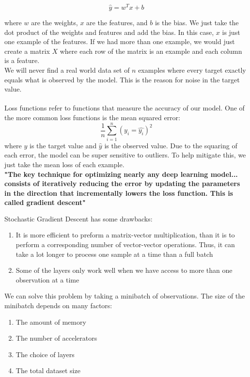 \documentclass{report}
\begin{document}
$$\hat{y} = w^Tx + b$$

where $w$ are the weights, $x$ are the features, and $b$ is the bias. We just take the dot product of the weights and features and add the bias. In this case, $x$ is just one example of the features. If we had more than one example, we would just create a matrix $X$ where each row of the matrix is an example and each column is a feature. 
\\

We will never find a real world data set of $n$ examples where every target exactly equals what is observed by the model. This is the reason for noise in the target value. 
\\

\\

Loss functions refer to functions that measure the accuracy of our model. One of the more common loss functions is the mean squared error: 
$$\frac{1}{n}\sum_{i=1}^n\left(y_i = \hat{y_i}\right)^2$$ where $y$ is the target value and $\hat{y}$ is the observed value. Due to the squaring of each error, the model can be super sensitive to outliers. To help mitigate this, we just take the mean loss of each example.
\\

\textbf{"The key technique for optimizing nearly any deep learning model... consists of iteratively reducing the error by updating the parameters in the direction that incrementally lowers the loss function. This is called gradient descent"}
\\



Stochastic Gradient Descent has some drawbacks:
\begin{enumerate}
    \item It is more efficient to preform a matrix-vector multiplication, than it is to perform a corresponding number of vector-vector operations. Thus, it can take a lot longer to process one sample at a time than a full batch
    \item Some of the layers only work well when we have access to more than one observation at a time
\end{enumerate}

We can solve this problem by taking a minibatch of observations. The size of the minibatch depends on many factors: 
\begin{enumerate}
    \item The amount of memory
    \item The number of accelerators
    \item The choice of layers 
    \item The total dataset size
\end{enumerate}
\end{document}
